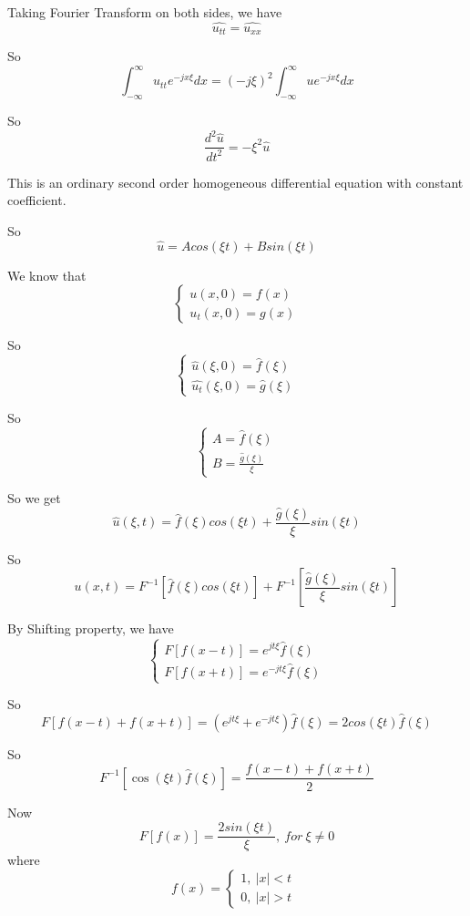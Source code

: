\documentclass{article}
\begin{document}
Taking Fourier Transform on both sides, we have $$\hat{u_{tt}}=\hat{u_{xx}}$$

So
$$\int_{-\infty{}}^{\infty{}}u_{tt}e^{-jx\xi{}}dx={(-j\xi{})}^2\int_{-\infty{}}^{\infty{}}ue^{-jx\xi{}}dx$$

So $$\frac{d^2\hat{u}}{dt^2}=-{\xi{}}^2\hat{u}$$

This is an ordinary second order homogeneous differential equation with constant
coefficient.

So $$\hat{u}=Acos(\xi{}t)+Bsin(\xi{}t)$$

We know that $$\left\{\begin{array}{l}u\left(x,0\right)=f\left(x\right) \\
u_t\left(x,0\right)=g\left(x\right)\end{array}\right.$$

So
$$\left\{\begin{array}{l}\hat{u}\left(\xi{},0\right)=\hat{f}\left(\xi{}\right) \\
\hat{u_t}\left(\xi{},0\right)=\hat{g}\left(\xi{}\right)\end{array}\right.$$

So $$\left\{\begin{array}{l}A=\hat{f}\left(\xi{}\right) \\
B=\frac{\hat{g}\left(\xi{}\right)}{\xi{}}\end{array}\right.$$

So we get
$$\hat{u}\left(\xi{},t\right)=\hat{f}\left(\xi{}\right)cos\left(\xi{}t\right)+\frac{\hat{g}\left(\xi{}\right)}{\xi{}}sin(\xi{}t)$$

So
$$u\left(x,t\right)=F^{-1}[\hat{f}\left(\xi{}\right)cos\left(\xi{}t\right)]+F^{-1}[\frac{\hat{g}\left(\xi{}\right)}{\xi{}}sin(\xi{}t)]$$


By Shifting property, we have
$$\left\{\begin{array}{l}F[f\left(x-t\right)]=e^{jt\xi{}}\hat{f}(\xi{}) \\
F\left[f\left(x+t\right)\right]=e^{-jt\xi{}}\hat{f}(\xi{})\end{array}\right.$$

So
$$F\left[f\left(x-t\right)+f\left(x+t\right)\right]=\left(e^{jt\xi{}}+e^{-jt\xi{}}\right)\hat{f}\left(\xi{}\right)=2cos(\xi{}t)\hat{f}(\xi{})$$

So
$$F^{-1}\left[\cos{\left(\xi{}t\right)}\hat{f}\left(\xi{}\right)\right]=\frac{f\left(x-t\right)+f\left(x+t\right)}{2}$$

Now $$F\left[f\left(x\right)\right]=\frac{2sin(\xi{}t)}{\xi{}},\ for\
\xi{}\not=0$$ where $$f(x)=\left\{\begin{array}{l}1,\
\left\vert{}x\right\vert{}<t\ \  \\
0,\ \left\vert{}x\right\vert{}>t\end{array}\right.$$
\end{document}
